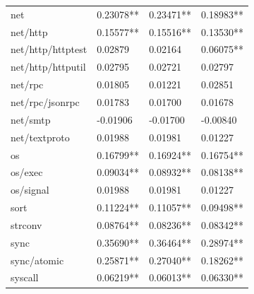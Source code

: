 \documentclass{seal_thesis}
\begin{document}
\begin{table}[H]
\begin{tabular}{@{}llll@{}}
		net & \cellcolor[HTML]{C0C0C0}0.23078** & \cellcolor[HTML]{C0C0C0}0.23471** & \cellcolor[HTML]{99CCFF}0.18983** \\
		net/http & \cellcolor[HTML]{99CCFF}0.15577** & \cellcolor[HTML]{99CCFF}0.15516** & \cellcolor[HTML]{99CCFF}0.13530** \\
		net/http/httptest & \cellcolor[HTML]{3366FF}0.02879 & \cellcolor[HTML]{3366FF}0.02164 & \cellcolor[HTML]{3366FF}0.06075** \\
		net/http/httputil & \cellcolor[HTML]{3366FF}0.02795 & \cellcolor[HTML]{3366FF}0.02721 & \cellcolor[HTML]{3366FF}0.02797 \\
		net/rpc & \cellcolor[HTML]{333399}\color{white}0.01805 & \cellcolor[HTML]{333399}\color{white}0.01221 & \cellcolor[HTML]{3366FF}0.02851 \\
		net/rpc/jsonrpc & \cellcolor[HTML]{333399}\color{white}0.01783 & \cellcolor[HTML]{333399}\color{white}0.01700 & \cellcolor[HTML]{333399}\color{white}0.01678 \\
		net/smtp & \cellcolor[HTML]{333399}\color{white}-0.01906 & \cellcolor[HTML]{333399}\color{white}-0.01700 & \cellcolor[HTML]{333399}\color{white}-0.00840 \\
		net/textproto & \cellcolor[HTML]{3366FF}0.01988 & \cellcolor[HTML]{3366FF}0.01981 & \cellcolor[HTML]{333399}\color{white}0.01227 \\
		os & \cellcolor[HTML]{99CCFF}0.16799** & \cellcolor[HTML]{99CCFF}0.16924** & \cellcolor[HTML]{99CCFF}0.16754** \\
		os/exec & \cellcolor[HTML]{99CCFF}0.09034** & \cellcolor[HTML]{99CCFF}0.08932** & \cellcolor[HTML]{99CCFF}0.08138** \\
		os/signal & \cellcolor[HTML]{3366FF}0.01988 & \cellcolor[HTML]{3366FF}0.01981 & \cellcolor[HTML]{333399}\color{white}0.01227 \\
		sort & \cellcolor[HTML]{99CCFF}0.11224** & \cellcolor[HTML]{99CCFF}0.11057** & \cellcolor[HTML]{99CCFF}0.09498** \\
		strconv & \cellcolor[HTML]{99CCFF}0.08764** & \cellcolor[HTML]{99CCFF}0.08236** & \cellcolor[HTML]{99CCFF}0.08342** \\
		sync & \cellcolor[HTML]{FF8080}0.35690** & \cellcolor[HTML]{FF8080}0.36464** & \cellcolor[HTML]{FFCC99}0.28974** \\
		sync/atomic & \cellcolor[HTML]{FFCC99}0.25871** & \cellcolor[HTML]{FFCC99}0.27040** & \cellcolor[HTML]{99CCFF}0.18262** \\
		syscall & \cellcolor[HTML]{3366FF}0.06219** & \cellcolor[HTML]{3366FF}0.06013** & \cellcolor[HTML]{3366FF}0.06330** \\\bottomrule
	\end{tabular}
\end{table}
\end{document}
